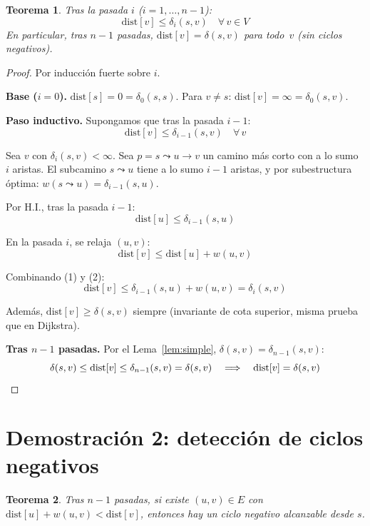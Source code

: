 \documentclass[11pt, letterpaper]{article}
\theoremstyle{definition}
\theoremstyle{plain}
\newtheorem{theorem}{Teorema}[section]
\theoremstyle{remark}
\begin{document}
\begin{theorem}\label{thm:correctness}
Tras la pasada $i$ ($i = 1, \ldots, n{-}1$):
\[
  \mathrm{dist}[v] \leq \delta_i(s,v) \quad \forall\, v \in V
\]
En particular, tras $n - 1$ pasadas,
$\mathrm{dist}[v] = \delta(s,v)$ para todo~$v$ (sin ciclos
negativos).
\end{theorem}

\begin{proof}
Por inducción fuerte sobre $i$.

\textbf{Base ($i = 0$).} $\mathrm{dist}[s] = 0 = \delta_0(s,s)$.
Para $v \neq s$:
$\mathrm{dist}[v] = \infty = \delta_0(s,v)$. \checkmark

\textbf{Paso inductivo.} Supongamos que tras la pasada $i - 1$:
\[
  \mathrm{dist}[v] \leq \delta_{i-1}(s,v) \quad \forall\, v
  \tag{H.I.}
\]

Sea $v$ con $\delta_i(s,v) < \infty$. Sea
$p = s \leadsto u \to v$ un camino más corto con a lo sumo $i$
aristas. El subcamino $s \leadsto u$ tiene a lo sumo $i - 1$
aristas, y por subestructura óptima:
$w(s \leadsto u) = \delta_{i-1}(s,u)$.

Por H.I., tras la pasada $i - 1$:
\[
  \mathrm{dist}[u] \leq \delta_{i-1}(s,u) \tag{1}
\]

En la pasada $i$, se relaja $(u,v)$:
\[
  \mathrm{dist}[v] \leq \mathrm{dist}[u] + w(u,v) \tag{2}
\]

Combinando (1) y (2):
\[
  \mathrm{dist}[v] \leq \delta_{i-1}(s,u) + w(u,v)
  = \delta_i(s,v) \tag{3}
\]

Además, $\mathrm{dist}[v] \geq \delta(s,v)$ siempre (invariante de
cota superior, misma prueba que en Dijkstra).

\textbf{Tras $n - 1$ pasadas.} Por el Lema~\ref{lem:simple},
$\delta(s,v) = \delta_{n-1}(s,v)$:
\[
  \delta(s,v) \leq \mathrm{dist}[v]
  \leq \delta_{n-1}(s,v) = \delta(s,v)
  \quad\Longrightarrow\quad
  \mathrm{dist}[v] = \delta(s,v) \qedhere
\]
\end{proof}

\section{Demostración 2: detección de ciclos negativos}

\begin{theorem}\label{thm:negcycle}
Tras $n - 1$ pasadas, si existe $(u,v) \in E$ con
$\mathrm{dist}[u] + w(u,v) < \mathrm{dist}[v]$, entonces hay un
ciclo negativo alcanzable desde $s$.
\end{theorem}
\end{document}

